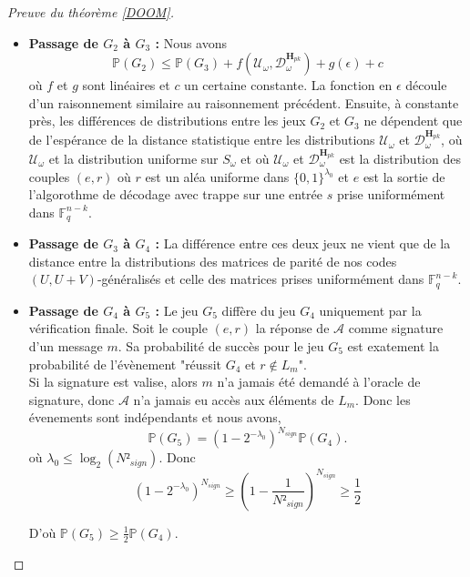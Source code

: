 \documentclass[12pt]{article}
\theoremstyle{plain}
\newtheorem{propo}[thm]{Proposition}
\newcommand{\F}{\mathbb{F}}
\newcommand{\e}{\mathbf{e}}
\begin{document}
\begin{appendix}
\begin{proof}[Preuve du théorème \ref{DOOM}]
\begin{itemize}
\begin{equation}
\begin{split}
&\leq \mathbb{E}_{\mathbf{H}_{pk}}(\rho(X_1,...,X_{N_{hash}},Y_1,...,Y_{N_{hash}}))\\
\end{split}
\end{equation}
\begin{propo} Soit $X$ la distribution uniforme dans $\F_q^{n-k}$ et $Y$ la distribution de $\e\mathbf{H}^T$ avec $e$ uniformément distribué dans $S_{\omega}$. Alors
$$\mathbb{E}_{H_{pk}}(\rho(X,Y)) \leq \frac{1}{2}\sqrt{\epsilon} $$
où $\epsilon$ est une borne qui décroit exponentiellement avec $n$.
\end{propo}
Par les deux propositions précédentes et par un raisonnement par récurrence, on termine la preuve. 
\item \textbf{Passage de $G_2$ à $G_3$ : } Nous avons
$$ \mathbb{P}(G_2) \leq  \mathbb{P}(G_3) + f(\mathcal{U}_{\omega},\mathcal{D}_{\omega}^{\mathbf{H}_{pk}}) + g(\epsilon) + c$$
où $f$ et $g$ sont linéaires et $c$ un certaine constante.
La fonction en $\epsilon$ découle d'un raisonnement similaire au raisonnement précédent. Ensuite, à constante près, les différences de distributions entre les jeux $G_2$ et $G_3$ ne dépendent que de l'espérance de la distance statistique entre les distributions $\mathcal{U}_{\omega}$ et $\mathcal{D}_{\omega}^{\mathbf{H}_{pk}}$, où $\mathcal{U}_{\omega}$ et la distribution uniforme sur $S_{\omega}$ et où $\mathcal{U}_{\omega}$ et $\mathcal{D}_{\omega}^{\mathbf{H}_{pk}}$ est la distribution des couples $(e,r)$ où $r$ est un aléa uniforme dans $\{0,1\}^{\lambda_0}$ et $e$ est la sortie de l'algorothme de décodage avec trappe sur une entrée $s$ prise uniformément dans $\F_q^{n-k}$.
\item \textbf{Passage de $G_3$ à $G_4$ : } La différence entre ces deux jeux ne vient que de la distance entre la distributions des matrices de parité de nos codes $(U,U+V)$-généralisés et celle des matrices prises uniformément dans $\F_q^{n-k}$.
\item \textbf{Passage de $G_4$ à $G_5$ : } Le jeu $G_5$ diffère du jeu $G_4$ uniquement par la vérification finale. Soit le couple $(e,r)$ la réponse de $\mathcal{A}$ comme signature d'un message $m$. Sa probabilité de succès pour le jeu $G_5$ est exatement la probabilité de l'évènement "réussit $G_4$ et $r\notin L_m$".  \\
Si la signature est valise, alors $m$ n'a jamais été demandé à l'oracle de signature, donc $\mathcal{A}$ n'a jamais eu accès aux éléments de $L_m$. Donc les évenements sont indépendants et nous avons,
$$\mathbb{P}(G_5) = (1 - 2^{- \lambda_0})^{N_{sign}}\mathbb{P}(G_4).$$
où $\lambda_0 \leq \log_2(N²_{sign})$. Donc
$$(1-2^{-\lambda_0})^{N_{sign}} \geq (1-\frac{1}{N²_{sign}})^{N_{sign}} \geq \frac{1}{2} $$

D'où $\mathbb{P}(G_5) \geq\frac{1}{2}\mathbb{P}(G_4)$.
\end{itemize}

\end{proof}


\end{appendix}



\end{document}
